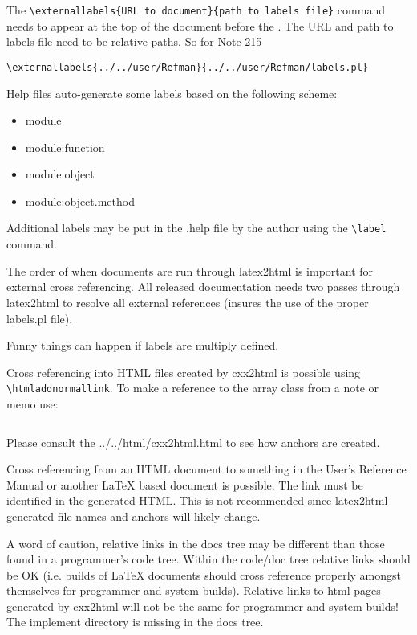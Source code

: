 The \verb!\externallabels{URL to document}{path to labels file}! command
needs to appear at the top of the document before the \verb!!. 
The URL and path to labels file need to be relative paths.  So for Note 215
\begin{verbatim}
\externallabels{../../user/Refman}{../../user/Refman/labels.pl}
\end{verbatim}

Help files auto-generate some labels based on the following scheme:
\begin{itemize}
\item module
\item module:function
\item module:object
\item module:object.method
\end{itemize}
Additional labels may be put in the .help file by the author using the 
\verb!\label! command.

The order of when documents are run through latex2html is important
for external cross referencing. All released 
documentation needs two passes through latex2html to resolve all 
external references (insures the use of the proper labels.pl file).  

Funny things can happen if labels are multiply defined.


Cross referencing into HTML files created by cxx2html is possible using
\verb!\htmladdnormallink!.  To make a reference to the array class
from a note or memo use:
\begin{verbatim}
\end{verbatim}

Please consult the 
{../../html/cxx2html.html} to see how anchors are created.

Cross referencing from an HTML document to something in the User's
Reference Manual or another LaTeX based document is possible.
The link must be identified 
in the generated HTML.  This is not recommended since latex2html generated
file names and anchors will likely change.

A word of caution, relative links in the docs tree may be different than those
found in a programmer's code tree.  Within the code/doc tree relative links
should be OK (i.e. builds of LaTeX documents should cross reference properly
amongst themselves for programmer and system builds).  Relative links to html
pages generated by cxx2html will not be the same for programmer and system
builds!  The implement directory is missing in the docs tree.

